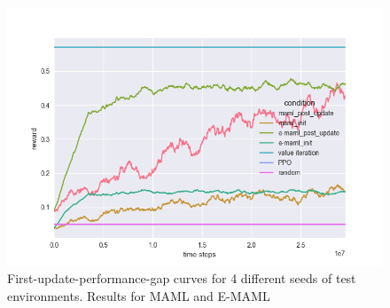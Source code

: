 \documentclass{article} %
\begin{document}
\begin{figure}[H]
\begin{center}
\includegraphics[scale=0.16]{bradly_curves/gap_grids_maml_4.png}
\end{center}
\caption{First-update-performance-gap curves for 4 different seeds of test environments. Results for MAML and E-MAML}
\label{fig:appendix-gap-curves-0}
\end{figure} 
\end{document}
